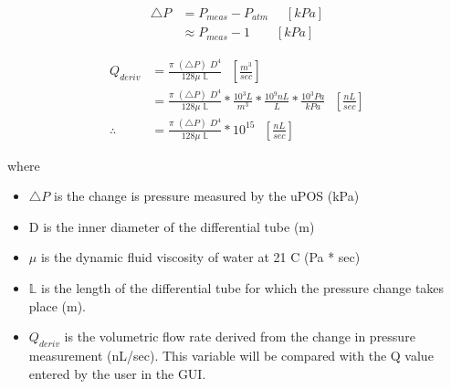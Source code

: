 \documentclass[journal]{IEEEtran}
\begin{document}
        \begin{equation}
            \begin{split}
                \triangle P &= P_{meas} - P_{atm} \,\,\,\,\,\,\,\, [kPa] \\
                &\approx  P_{meas} - 1 \,\,\,\,\,\,\,\,\,\,\,\, [kPa]
            \end{split}
        \end{equation}
        
        
        \begin{equation}
            \begin{split}
                Q_{deriv} &= \frac{\pi \,\,(\triangle P) \,\,D^4}{128 \mu \,\,\mathbb{L}}  \,\,\,\,\left[\frac{m^3}{sec}\right]\\
                &= \frac{\pi \,\,(\triangle P) \,\,D^4}{128 \mu \,\,\mathbb{L}} * \frac{10^3 L}{m^3} * \frac{10^9 nL}{L} * \frac{10^3 Pa}{kPa} \,\,\,\,\left[\frac{nL}{sec}\right]\\
                \therefore &= \frac{\pi \,\,(\triangle P) \,\,D^4}{128 \mu \,\,\mathbb{L}} * 10^{15}  \,\,\,\,\left[\frac{nL}{sec}\right]
            \end{split}
        \end{equation}
        
        where
        \begin{itemize}
            \item \(\triangle P \) is the change is pressure measured by the uPOS (kPa)
            \item D is the inner diameter of the differential tube (m)
            \item \( \mu \) is the dynamic fluid viscosity of water at 21 C (Pa * sec)
            \item $\mathbb{L}$ is the length of the differential tube for which the pressure change takes place (m).
            \item \( Q_{deriv}\) is the volumetric flow rate derived from the change in pressure measurement (nL/sec). This variable will be compared with the Q value entered by the user in the GUI. 
        \end{itemize}
        
\end{document}
